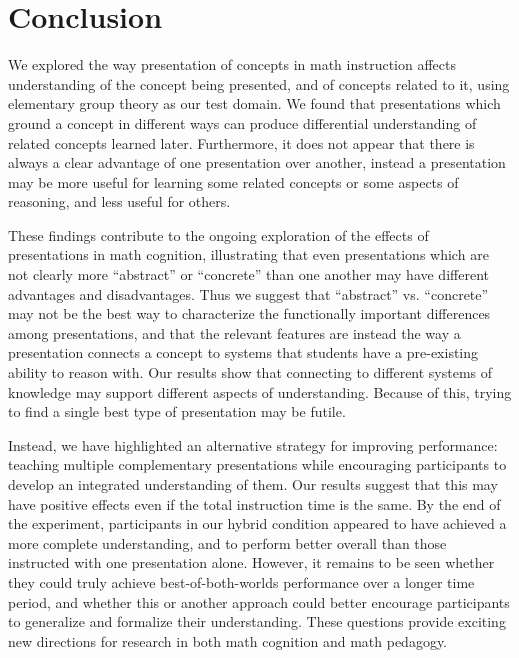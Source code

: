\documentclass[man,10pt]{apa6}
\begin{document}
\section{Conclusion}
We explored the way presentation of concepts in math instruction affects understanding of the concept being presented, and of concepts related to it, using elementary group theory as our test domain. We found that presentations which ground a concept in different ways can produce differential understanding of related concepts learned later. Furthermore, it does not appear that there is always a clear advantage of one presentation over another, instead a presentation may be more useful for learning some related concepts or some aspects of reasoning, and less useful for others.\par
These findings contribute to the ongoing exploration of the effects of presentations in math cognition, illustrating that even presentations which are not clearly more ``abstract'' or ``concrete'' than one another may have different advantages and disadvantages. Thus we suggest that ``abstract'' vs. ``concrete'' may not be the best way to characterize the functionally important differences among presentations, and that the relevant features are instead the way a presentation connects a concept to systems that students have a pre-existing ability to reason with. Our results show that connecting to different systems of knowledge may support different aspects of understanding. Because of this, trying to find a single best type of presentation may be futile. \par
Instead, we have highlighted an alternative strategy for improving performance: teaching multiple complementary presentations while encouraging participants to develop an integrated understanding of them. Our results suggest that this may have positive effects even if the total instruction time is the same. By the end of the experiment, participants in our hybrid condition appeared to have achieved a more complete understanding, and to perform better overall than those instructed with one presentation alone. However, it remains to be seen whether they could truly achieve best-of-both-worlds performance over a longer time period, and whether this or another approach could better encourage participants to generalize and formalize their understanding. These questions provide exciting new directions for research in both math cognition and math pedagogy. \par
 
\end{document}
